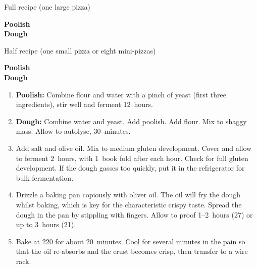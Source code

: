
\begin{minipage}{.45\textwidth}
  Full recipe (one large pizza)

  \begin{ingredients}
    \textbf{Poolish}\\
    \textbf{Dough}\\
  \end{ingredients}
\end{minipage}
\begin{minipage}{.45\textwidth}
  Half recipe (one small pizza or eight mini-pizzas)

  \begin{ingredients}
    \textbf{Poolish}\\
    \textbf{Dough}\\
  \end{ingredients}
\end{minipage}

\begin{recipe}
  \begin{enumerate}

  \item \textbf{Poolish:} Combine flour and water with a pinch of
    yeast (first three ingredients), stir well and ferment 12~hours.

  \item \textbf{Dough:} Combine water and yeast.  Add poolish.  Add
    flour.  Mix to shaggy mass.  Allow to autolyse, 30~minutes.

  \item Add salt and olive oil.  Mix to medium gluten development.
    Cover and allow to ferment 2\fracH~hours, with 1~book fold after
    each hour.  Check for full gluten development.  If the dough
    gasses too quickly, put it in the refrigerator for bulk fermentation.

  \item Drizzle a baking pan copiously with oliver oil.  The oil will
    fry the dough whilst baking, which is key for the characteristic
    crispy taste.  Spread the dough in the pan by stippling with
    fingers.  Allow to proof 1\fracH--2~hours (27\degreeC) or up to
    3~hours (21\degreeC).

  \item Bake at 220\degreeC{} for about 20~minutes.  Cool for several
    minutes in the pain so that the oil re-absorbs and the crust
    becomes crisp, then transfer to a wire rack.

  \end{enumerate}
\end{recipe}


